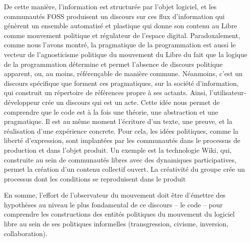 De cette manière, l'information est structurée par l'objet logiciel, et les communautés FOSS produisent un discours sur ces flux d'information qui génèrent un ensemble automatisé et plastique qui donne son contenu au Libre comme mouvement politique et régulateur de l'espace digital. Paradoxalement, comme nous l'avons montré, la pragmatique de la programmation est aussi le vecteur de l'agnosticisme politique du mouvement du Libre du fait que la logique de la programmation détermine et permet l'absence de discours politique apparent, ou, au moins, référençable de manière commune. Néanmoins, c'est un discours spécifique que forment ces pragmatiques, sur la société d'information, qui construit un répertoire de références propre à ses actants. Ainsi, l'utilisateur-développeur crée un discours qui est un acte. Cette idée nous permet de comprendre que le code est à la fois une théorie, une abstraction et une pragmatique. Il est au même moment l'écriture d'un texte, une preuve, et la réalisation d'une expérience concrete. Pour cela, les idées politiques, comme la liberté d'expression, sont implantées par les communautés dans le processus de production et dans l'objet produit. Un exemple est la technologie Wiki, qui, construite au sein de communautés libres avec des dynamiques participatives, permet la création d'un contenu collectif ouvert. La créativité du groupe crée un processus dont les conditions se reproduisent dans le produit \citep{Sawyer2003}

En somme, l'effort de l'observateur du mouvement doit être d'émettre des hypothèses au niveau le plus fondamental de ce discours -- le code -- pour comprendre les constructions des entités politiques du mouvement du logiciel libre au sein de ses politiques informelles (transgression, civisme, inversion, collaboration).

